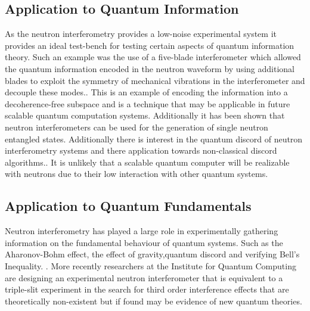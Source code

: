 \subsection{Application to Quantum Information}
As the neutron interferometry provides a low-noise experimental system it provides an ideal test-bench for testing certain aspects of quantum information theory. Such an example was the use of a five-blade interferometer which allowed the quantum information encoded in the neutron waveform by using additional blades to exploit the symmetry of mechanical vibrations in the interferometer and decouple these modes.\cite{five_blade}. This is an example of encoding the information into a decoherence-free subspace and is a technique that may be applicable in future scalable quantum computation systems. Additionally it has been shown that neutron interferometers can be used for the generation of single neutron entangled states. \cite{neutron_entanglement}   Additionally there is interest in the quantum discord of neutron interferometry systems and there application towards non-classical discord algorithms.\cite{noise_neutron}. It is unlikely that a scalable quantum computer will be realizable with neutrons due to their low interaction with other quantum systems.  
\subsection{Application to Quantum Fundamentals}
Neutron interferometry has played a large role in experimentally gathering information on the fundamental behaviour of quantum systems. Such as the Aharonov-Bohm effect, the effect of gravity,quantum discord and verifying Bell's Inequality. \cite{neutron_history}\cite{cow}\cite{noise_neutron}\cite{bells_inequality}. More recently researchers at the Institute for Quantum Computing are designing an experimental neutron interferometer that is equivalent to a triple-slit experiment in the search for third order interference effects that are theoretically non-existent but if found may be evidence of new quantum theories.\cite{three_slit} 
